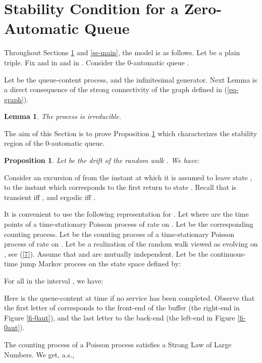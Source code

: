 \documentclass[11pt,a4paper]{article}
\newtheorem{proposition}[theorem]{Proposition}
\newtheorem{lemma}[theorem]{Lemma}
\theoremstyle{remark}
\def\eref#1{(\ref{#1})}
\begin{document}
\section{Stability Condition for a Zero-Automatic Queue}
\label{se-stab}

Throughout Sections \ref{se-stab} and \ref{se-main}, the model is
as follows. Let  be a plain triple. Fix 
and  in  and  in . Consider the 0-automatic
queue .

\medskip

Let  be the queue-content process, and  the
infinitesimal generator. Next Lemma is a direct consequence of the
strong connectivity of the graph  defined in
\eref{eq-graph}. 

\begin{lemma}
The process  is irreducible.
\end{lemma}

The aim of this Section is to prove Proposition
\ref{pr-stability} which characterizes the stability region of the 0-automatic
queue.

\begin{proposition}\label{pr-stability}
Let
 be the drift of the random walk .
We have:

\end{proposition}

Consider an excursion of  from the instant  at which it is
assumed to leave state , to the instant  which corresponds to
the first return to state . Recall that  is transient iff
, and ergodic iff .

It is convenient to
use the following representation for .
Let  where  are the time
points of a time-stationary 
Poisson process of rate  on . Let  be the corresponding counting process. Let  be the counting process of a time-stationary Poisson
process of rate  on .
Let  be a realization of the
random walk  viewed as evolving on , see
\eref{7}. Assume that  and  are mutually
independent. Let  be the continuous-time jump Markov
process on the state space  defined by:


For all  in the interval , we have:


Here  is the queue-content at time  if no service has
been completed. Observe that the first letter of 
corresponds to the front-end of the buffer (the right-end in Figure
\ref{fi-0aut}), and the last letter to the back-end (the left-end in Figure
\ref{fi-0aut}).

\medskip

The counting process of a Poisson process satisfies a Strong Law
of Large Numbers. We get, a.s.,
\end{document}
